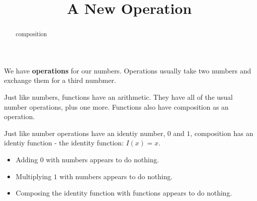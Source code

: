 \documentclass{ximera}
\title{A New Operation}
\begin{document}
\begin{abstract}
composition
\end{abstract}
\maketitle





We have \textbf{operations} for our numbers.  Operations usually take two numbers and exchange them for a third numbmer.



Just like numbers, functions have an arithmetic.  They have all of the usual number operations, plus one more.  Functions also have composition as an operation.

Just like number operations have an identiy number, $0$ and $1$, composition has an identiy function - the identity function: $I(x) = x$.


\begin{itemize}
\item Adding $0$ with numbers appears to do nothing.
\item Multiplying $1$ with numbers appears to do nothing.
\item Composing the identity function with functions appears to do nothing.
\end{itemize}
\end{document}
